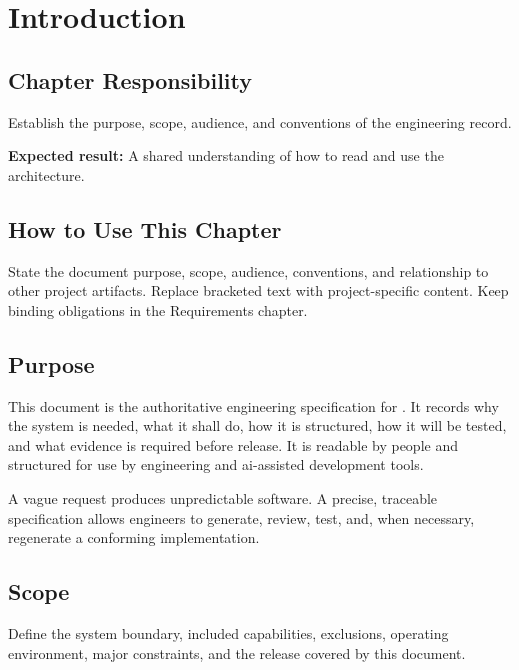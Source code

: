 \chapter{Introduction}

\section{Chapter Responsibility}
\label{Section:IntroductionResponsibility}
Establish the purpose, scope, audience, and conventions of the engineering record.

\noindent\textbf{Expected result:} A shared understanding of how to read and use the architecture.

\section{How to Use This Chapter}
State the document purpose, scope, audience, conventions, and relationship to
other project artifacts. Replace bracketed text with project-specific content.
Keep binding obligations in the Requirements chapter.

\section{Purpose}
This document is the authoritative engineering specification for
\ProjectName. It records why the system is needed, what it shall do, how it is
structured, how it will be tested, and what evidence is required before
release. It is readable by people and structured for use by engineering and
\gls{ai}-assisted development tools.

\begin{dsnNote}
A vague request produces unpredictable software. A precise, traceable
specification allows engineers to generate, review, test, and, when necessary,
regenerate a conforming implementation.
\end{dsnNote}

\section{Scope}
Define the system boundary, included capabilities, exclusions, operating
environment, major constraints, and the release covered by this document.

